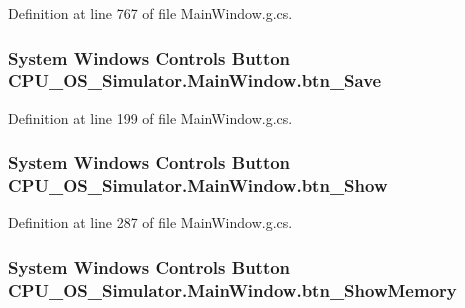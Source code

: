 Definition at line 767 of file Main\+Window.\+g.\+cs.

\hypertarget{class_c_p_u___o_s___simulator_1_1_main_window_a638eee3b21f6ac5d28a5c95c4dad3fc2}{}
\subsubsection[{btn\+\_\+\+Save}]{\setlength{\rightskip}{0pt plus 5cm}System Windows Controls Button C\+P\+U\+\_\+\+O\+S\+\_\+\+Simulator.\+Main\+Window.\+btn\+\_\+\+Save\hspace{0.3cm}{\ttfamily [package]}}\label{class_c_p_u___o_s___simulator_1_1_main_window_a638eee3b21f6ac5d28a5c95c4dad3fc2}


Definition at line 199 of file Main\+Window.\+g.\+cs.

\hypertarget{class_c_p_u___o_s___simulator_1_1_main_window_a3c6c4760a8fd64f653fff0ad06374f13}{}
\subsubsection[{btn\+\_\+\+Show}]{\setlength{\rightskip}{0pt plus 5cm}System Windows Controls Button C\+P\+U\+\_\+\+O\+S\+\_\+\+Simulator.\+Main\+Window.\+btn\+\_\+\+Show\hspace{0.3cm}{\ttfamily [package]}}\label{class_c_p_u___o_s___simulator_1_1_main_window_a3c6c4760a8fd64f653fff0ad06374f13}


Definition at line 287 of file Main\+Window.\+g.\+cs.

\hypertarget{class_c_p_u___o_s___simulator_1_1_main_window_af2d1c3293ffaa1d203a9bdb8bf282eab}{}
\subsubsection[{btn\+\_\+\+Show\+Memory}]{\setlength{\rightskip}{0pt plus 5cm}System Windows Controls Button C\+P\+U\+\_\+\+O\+S\+\_\+\+Simulator.\+Main\+Window.\+btn\+\_\+\+Show\+Memory\hspace{0.3cm}{\ttfamily [package]}}\label{class_c_p_u___o_s___simulator_1_1_main_window_af2d1c3293ffaa1d203a9bdb8bf282eab}


